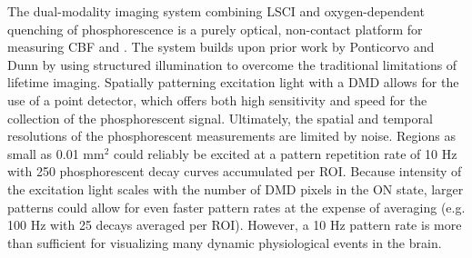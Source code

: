 The dual-modality imaging system combining LSCI and oxygen-dependent quenching of phosphorescence is a purely optical, non-contact platform for measuring CBF and . The system builds upon prior work by Ponticorvo and Dunn \cite{Ponticorvo:2010uv} by using structured illumination to overcome the traditional limitations of lifetime imaging. Spatially patterning excitation light with a DMD allows for the use of a point detector, which offers both high sensitivity and speed for the collection of the phosphorescent signal. Ultimately, the spatial and temporal resolutions of the phosphorescent measurements are limited by noise. Regions as small as 0.01 mm$^2$ could reliably be excited at a pattern repetition rate of 10 Hz with 250 phosphorescent decay curves accumulated per ROI. Because intensity of the excitation light scales with the number of DMD pixels in the ON state, larger patterns could allow for even faster pattern rates at the expense of averaging (e.g. 100 Hz with 25 decays averaged per ROI). However, a 10 Hz pattern rate is more than sufficient for visualizing many dynamic physiological events in the brain.



